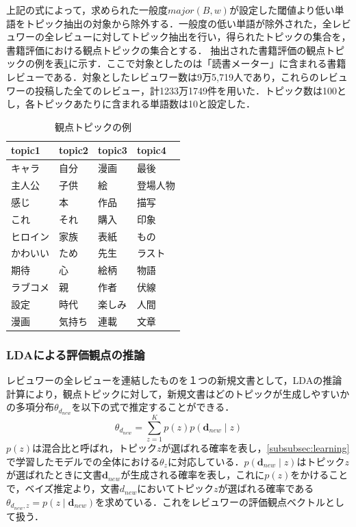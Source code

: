 \documentclass[a4paper,11pt,oneside,openany]{jsbook}
\begin{document}
上記の式によって，求められた一般度$major(B,w)$が設定した閾値より低い単語をトピック抽出の対象から除外する．一般度の低い単語が除外された，全レビュワーの全レビューに対してトピック抽出を行い，得られたトピックの集合を，書籍評価における観点トピックの集合とする．
抽出された書籍評価の観点トピックの例を表\ref{table:topic}に示す．ここで対象としたのは「読書メーター」に含まれる書籍レビューである．対象としたレビュワー数は9万5,719人であり，これらのレビュワーの投稿した全てのレビュー，計1233万1749件を用いた．トピック数は100とし，各トピックあたりに含まれる単語数は10と設定した．
\begin{table}[htb]
  \begin{center}
    \caption{観点トピックの例}
    \label{table:topic} %
    \begin{tabular}{|l|l|l|l|} \hline
      topic1 & topic2 & topic3 & topic4 \\ \hline \hline
      キャラ & 自分 & 漫画 & 最後 \\
      主人公 & 子供 & 絵 & 登場人物 \\
      感じ & 本 & 作品 & 描写 \\
      これ & それ & 購入 & 印象 \\
      ヒロイン & 家族 & 表紙 & もの \\
      かわいい & ため & 先生 & ラスト \\
      期待 & 心 & 絵柄 & 物語 \\
      ラブコメ & 親 & 作者 & 伏線 \\
      設定 & 時代 & 楽しみ & 人間 \\
      漫画 & 気持ち & 連載 & 文章 \\ \hline
    \end{tabular}
  \end{center}
\end{table}

		\subsubsection{LDAによる評価観点の推論}
レビュワーの全レビューを連結したものを１つの新規文書として，LDAの推論計算により，観点トピックに対して，新規文書はどのトピックが生成しやすいかの多項分布$\theta_{d_{new}}$を以下の式で推定することができる．
\begin{equation}
\theta_{d_{new}} = \sum_{ z=1 }^{K}p(z)p(\mathbf{d}_{new}\mid z)
\end{equation}
$p(z)$は混合比と呼ばれ，トピック$z$が選ばれる確率を表し，\ref{subsubsec:learning}で学習したモデルでの全体における$\theta_{z}$に対応している．$p(\mathbf{d}_{new}\mid z)$はトピック$z$が選ばれたときに文書$\mathbf{d}_{new}$が生成される確率を表し，これに$p(z)$をかけることで，ベイズ推定より，文書$d_{new}$においてトピック$z$が選ばれる確率である$\theta_{d_{new},z}=p(z \mid \mathbf{d}_{new})$を求めている．これをレビュワーの評価観点ベクトルとして扱う．
\end{document}
